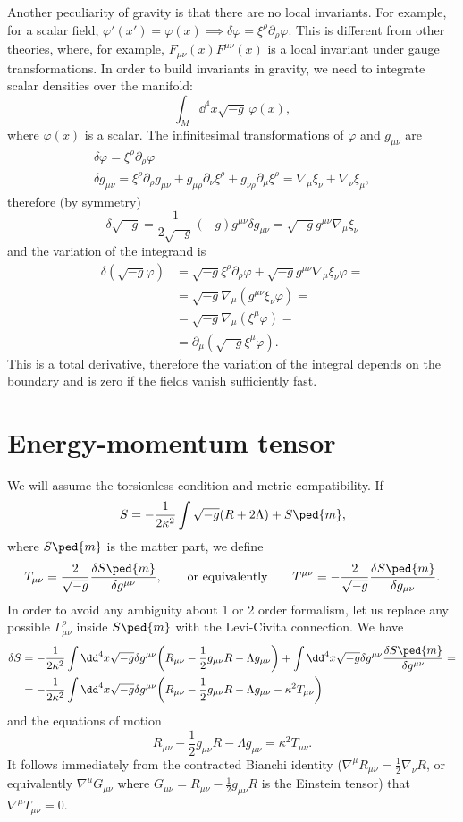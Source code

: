 \documentclass[a4paper,12pt]{book}
\begin{document}
Another peculiarity of gravity is that there are no local invariants. For example, for a scalar field, $\varphi'(x')=\varphi(x)\implies\delta\varphi=\xi^\rho\partial_\rho\varphi$. This is different from other theories, where, for example, $F_{\mu\nu}(x)F^{\mu\nu}(x)$ is a local invariant under gauge transformations. In order to build invariants in gravity, we need to integrate scalar densities over the manifold:
\[\int_M\dd^4x\sqrt{-g}\,\varphi(x),\]
where $\varphi(x)$ is a scalar. The infinitesimal transformations of $\varphi$ and $g_{\mu\nu}$ are
\begin{gather*}
\delta\varphi=\xi^\rho\partial_\rho\varphi\\
\delta g_{\mu\nu}=\xi^\rho\partial_\rho g_{\mu\nu}+g_{\mu\rho}\partial_\nu\xi^\rho+g_{\nu\rho}\partial_\mu\xi^\rho=\nabla_\mu\xi_\nu+\nabla_\nu\xi_\mu,
\end{gather*}
therefore (by symmetry)
\[\delta\sqrt{-g}=\frac1{2\sqrt{-g}}(-g)g^{\mu\nu}\delta g_{\mu\nu}=\sqrt{-g}g^{\mu\nu}\nabla_\mu\xi_\nu\]
and the variation of the integrand is
\begin{align*}
\delta(\sqrt{-g}\varphi)&=\sqrt{-g}\xi^\rho\partial_\rho\varphi+\sqrt{-g}g^{\mu\nu}\nabla_\mu\xi_\nu\varphi=\\
&=\sqrt{-g}\nabla_\mu(g^{\mu\nu}\xi_\nu\varphi)=\\
&=\sqrt{-g}\nabla_\mu(\xi^\mu\varphi)=\\
&=\partial_\mu(\sqrt{-g}\xi^\mu\varphi).
\end{align*}
This is a total derivative, therefore the variation of the integral depends on the boundary and is zero if the fields vanish sufficiently fast.

\section{Energy-momentum tensor}
We will assume the torsionless condition and metric compatibility. If
\[S=-\frac1{2\kappa^2}\int\sqrt{-g}(R+2\Lambda)+S\ped{m},\]
where $S\ped{m}$ is the matter part, we define
\[T_{\mu\nu}=\frac2{\sqrt{-g}}\frac{\delta S\ped{m}}{\delta g^{\mu\nu}},\qquad\text{or equivalently}\qquad T^{\mu\nu}=-\frac2{\sqrt{-g}}\frac{\delta S\ped{m}}{\delta g_{\mu\nu}}.\]
In order to avoid any ambiguity about 1 or 2 order formalism, let us replace any possible $\Gamma^\rho_{\mu\nu}$ inside $S\ped{m}$ with the Levi-Civita connection. We have
\begin{align*}
\delta S&=-\frac1{2\kappa^2}\int\dd^4x\sqrt{-g}\delta g^{\mu\nu}\biggl(R_{\mu\nu}-\frac12g_{\mu\nu}R-\Lambda g_{\mu\nu}\biggr)+\int\dd^4x\sqrt{-g}\delta g^{\mu\nu}\frac{\delta S\ped{m}}{\delta g^{\mu\nu}}=\\
&=-\frac1{2\kappa^2}\int\dd^4x\sqrt{-g}\delta g^{\mu\nu}\biggl(R_{\mu\nu}-\frac12g_{\mu\nu}R-\Lambda g_{\mu\nu}-\kappa^2T_{\mu\nu}\biggr)
\end{align*}
and the equations of motion
\[R_{\mu\nu}-\frac12g_{\mu\nu}R-\Lambda g_{\mu\nu}=\kappa^2T_{\mu\nu}.\]
It follows immediately from the contracted Bianchi identity ($\nabla^\mu R_{\mu\nu}=\frac12\nabla_\nu R$, or equivalently $\nabla^\mu G_{\mu\nu}$ where $G_{\mu\nu}=R_{\mu\nu}-\frac12g_{\mu\nu}R$ is the Einstein tensor) that $\nabla^\mu T_{\mu\nu}=0$.
\end{document}
